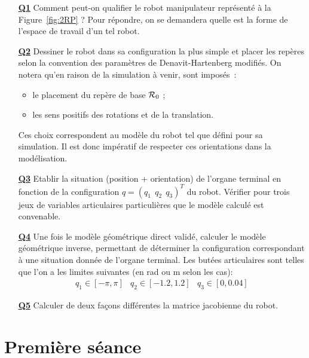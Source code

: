 \documentclass[12pt,a4paper]{article}
\begin{document}
\begin{itemize}

\medskip\item[\textbf{\underline{Q1}}] Comment peut-on qualifier le robot manipulateur représenté à la Figure~\ref{fig:2RP} ?  Pour répondre, on se demandera quelle est la forme de l'espace de travail d'un tel robot.

\medskip\item[\textbf{\underline{Q2}}] Dessiner le robot dans sa configuration la plus simple et placer les repères selon la convention des paramètres de Denavit-Hartenberg modifiés. On notera qu'en raison de la simulation à venir, sont imposés~:
\begin{itemize}
\item le placement du repère de base ${\cal R}_0$ ;  
\item  les sens positifs des rotations et de la translation. 
\end{itemize}
Ces choix correspondent au modèle du robot tel que défini pour sa simulation. Il est donc impératif de respecter ces orientations dans la modélisation.

\medskip\item[\textbf{\underline{Q3}}]  Etablir la situation (position + orientation) de l'organe terminal en fonction de la configuration $q=(q_1 \ \ q_2 \ \ q_3)^T$ du robot. Vérifier pour trois jeux de variables articulaires particulières que le modèle calculé est convenable.

\medskip\item[\textbf{\underline{Q4}}] Une fois le modèle géométrique direct validé, calculer le modèle géométrique inverse, permettant de déterminer la configuration correspondant à une situation donnée de l'organe terminal. Les butées articulaires sont telles que l'on a les  limites suivantes (en rad ou m selon les cas):
\begin{equation*}
\begin{array}{ccc}
    q_1\in[-\pi,\pi] & q_2 \in [-1.2,1.2] & q_3\in[0,0.04]
\end{array}
\end{equation*}

\medskip\item[\textbf{\underline{Q5}}] Calculer de deux façons différentes la matrice jacobienne du robot.
\end{itemize}

\newpage
\section{Première séance}
\end{document}
